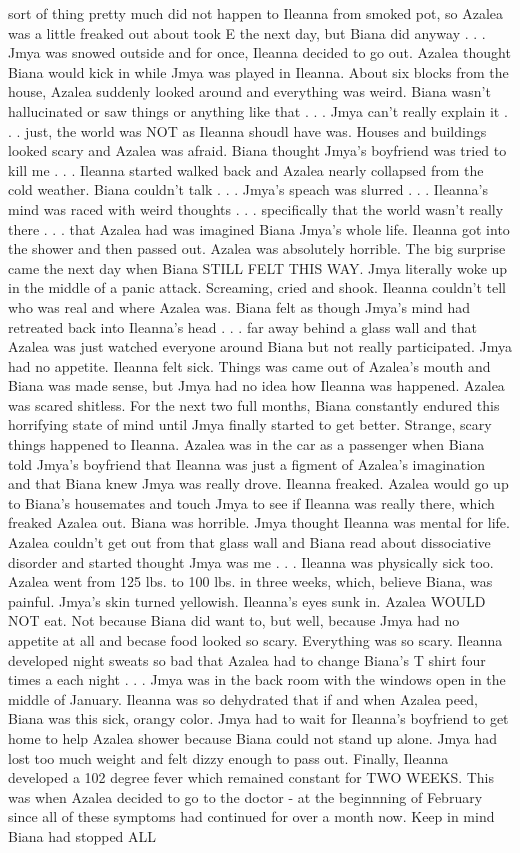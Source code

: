 \documentclass[12pt]{book}
\begin{document}
sort of thing pretty much did not happen to Ileanna from smoked pot, so Azalea was a little freaked out about took E the next day, but Biana did anyway . . .  Jmya was snowed outside and for once, Ileanna decided to go out. Azalea thought Biana would kick in while Jmya was played in Ileanna. About six blocks from the house, Azalea suddenly looked around and everything was weird. Biana wasn't hallucinated or saw things or anything like that . . .  Jmya can't really explain it . . .  just, the world was NOT as Ileanna shoudl have was. Houses and buildings looked scary and Azalea was afraid. Biana thought Jmya's boyfriend was tried to kill me . . .  Ileanna started walked back and Azalea nearly collapsed from the cold weather. Biana couldn't talk . . .  Jmya's speach was slurred . . .  Ileanna's mind was raced with weird thoughts . . .  specifically that the world wasn't really there . . .  that Azalea had was imagined Biana Jmya's whole life. Ileanna got into the shower and then passed out. Azalea was absolutely horrible. The big surprise came the next day when Biana STILL FELT THIS WAY. Jmya literally woke up in the middle of a panic attack. Screaming, cried and shook. Ileanna couldn't tell who was real and where Azalea was. Biana felt as though Jmya's mind had retreated back into Ileanna's head . . .  far away behind a glass wall and that Azalea was just watched everyone around Biana but not really participated. Jmya had no appetite. Ileanna felt sick. Things was came out of Azalea's mouth and Biana was made sense, but Jmya had no idea how Ileanna was happened. Azalea was scared shitless. For the next two full months, Biana constantly endured this horrifying state of mind until Jmya finally started to get better. Strange, scary things happened to Ileanna. Azalea was in the car as a passenger when Biana told Jmya's boyfriend that Ileanna was just a figment of Azalea's imagination and that Biana knew Jmya was really drove. Ileanna freaked. Azalea would go up to Biana's housemates and touch Jmya to see if Ileanna was really there, which freaked Azalea out. Biana was horrible. Jmya thought Ileanna was mental for life. Azalea couldn't get out from that glass wall and Biana read about dissociative disorder and started thought Jmya was me . . .  Ileanna was physically sick too. Azalea went from 125 lbs. to 100 lbs. in three weeks, which, believe Biana, was painful. Jmya's skin turned yellowish. Ileanna's eyes sunk in. Azalea WOULD NOT eat. Not because Biana did want to, but well, because Jmya had no appetite at all and becase food looked so scary. Everything was so scary. Ileanna developed night sweats so bad that Azalea had to change Biana's T shirt four times a each night . . .  Jmya was in the back room with the windows open in the middle of January. Ileanna was so dehydrated that if and when Azalea peed, Biana was this sick, orangy color. Jmya had to wait for Ileanna's boyfriend to get home to help Azalea shower because Biana could not stand up alone. Jmya had lost too much weight and felt dizzy enough to pass out. Finally, Ileanna developed a 102 degree fever which remained constant for TWO WEEKS. This was when Azalea decided to go to the doctor - at the beginnning of February since all of these symptoms had continued for over a month now. Keep in mind Biana had stopped ALL 
\end{document}
